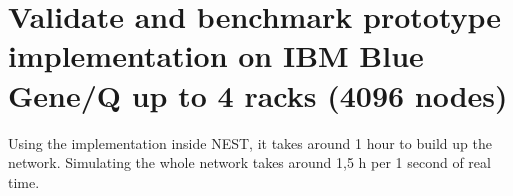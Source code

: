 \documentclass[a4paper]{article}
\begin{document}
\section{Validate and benchmark prototype implementation on IBM Blue Gene/Q up to 4 racks (4096 nodes)}
Using the implementation inside NEST, it takes around 1 hour to build up the network. Simulating the whole network takes around 1,5 h per 1 second of real time.
\begin{figure}[ht!]
     \begin{center}
        \\ %
\end{center}
\end{figure}
\end{document}
